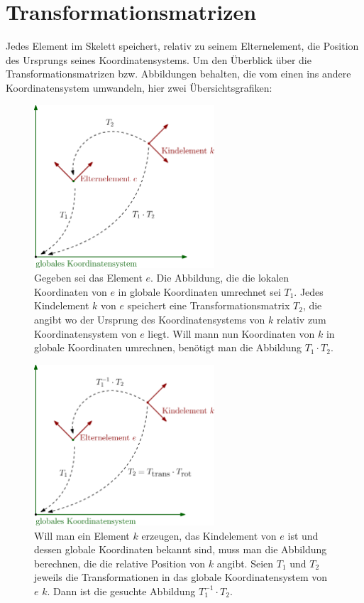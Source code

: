\section{Transformationsmatrizen}

Jedes Element im Skelett speichert, relativ zu seinem Elternelement, die Position des Ursprungs seines Koordinatensystems. Um den Überblick über die Transformationsmatrizen bzw. Abbildungen behalten, die vom einen ins andere Koordinatensystem umwandeln, hier zwei Übersichtsgrafiken:

\begin{figure}
 \centering
 \includegraphics[width=0.6\textwidth]{graphics/transformation_matrices.eps}
 \caption{Gegeben sei das Element $e$. Die Abbildung, die die lokalen Koordinaten von $e$ in globale Koordinaten umrechnet sei $T_1$.
 Jedes Kindelement $k$ von $e$ speichert eine Transformationsmatrix $T_2$, die angibt wo der Ursprung des Koordinatensystems von $k$ relativ zum Koordinatensystem von $e$ liegt. Will mann nun Koordinaten von $k$ in globale Koordinaten umrechnen, benötigt man die Abbildung $T_1 \cdot T_2$.}
\end{figure}

\begin{figure}
 \centering
 \includegraphics[width=0.6\textwidth]{graphics/transformation_matrices_spine.eps}
 \caption{Will man ein Element $k$ erzeugen, das Kindelement von $e$ ist und dessen globale Koordinaten bekannt sind, muss man die Abbildung berechnen, die die relative Position von $k$ angibt. Seien $T_1$ und $T_2$ jeweils die Transformationen in das globale Koordinatensystem von $e$ \bzw $k$. Dann ist die gesuchte Abbildung $T_1^{-1} \cdot T_2$.}
\end{figure}
